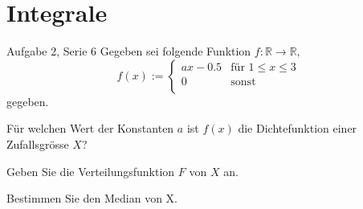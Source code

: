 \documentclass{beamer}
\begin{document}
\section{Integrale}
\begin{frame}{Aufgabe 2, Serie 6}
Gegeben sei folgende Funktion $f : \mathbb{R }\rightarrow \mathbb{R}$,
$$
f(x):=\begin{cases} ax-0.5 & \text{für } 1 \le x \le 3\\
     0 & \text{sonst}\\
     \end{cases}
$$
gegeben. 
\begin{outline}
\item Für welchen Wert der Konstanten $a$ ist $f(x)$ die Dichtefunktion einer Zufallsgrösse $X$?
\item Geben Sie die Verteilungsfunktion $F$ von $X$ an.
\item Bestimmen Sie den Median von X.
\end{outline}
\end{frame}
\end{document}
